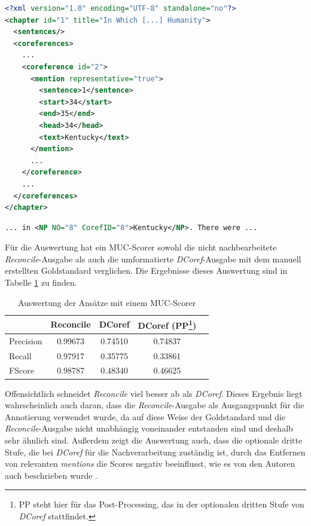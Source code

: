 \documentclass[a4paper,12pt,titlepage=true, ngerman]{scrartcl}
\begin{document}
\begin{lstlisting}[label=output:vergleich:decoref, name=vergleich_decoref.xml, language=xml, caption=Ausschnitt der \emph{DCoref}-Ausgabe für die Testdaten]
<?xml version="1.0" encoding="UTF-8" standalone="no"?>
<chapter id="1" title="In Which [...] Humanity">
  <sentences/>
  <coreferences>
    ...
    <coreference id="2">
      <mention representative="true">
        <sentence>1</sentence>
        <start>34</start>
        <end>35</end>
        <head>34</head>
        <text>Kentucky</text>
      </mention>
      ...
    </coreference>
    ...
  </coreferences>
</chapter>
\end{lstlisting}

\begin{lstlisting}[label=output:vergleich:reconcile, name=vergleich_reconcile.xml, language=xml, caption=Ausschnitt aus Listing \ref{output:vergleich:reconcile} im \emph{Reconcile}-Ausgabeformat]
... in <NP NO="8" CorefID="8">Kentucky</NP>. There were ...
\end{lstlisting}

\noindent 
Für die Auswertung hat ein MUC-Scorer sowohl die nicht nachbearbeitete \emph{Reconcile}-Ausgabe als auch 
die umformatierte \emph{DCoref}-Ausgabe mit dem manuell erstellten Goldstandard verglichen. 
Die Ergebnisse dieses Auswertung sind in Tabelle \ref{score:ergebnis} zu finden.

\begin{savenotes}
	\begin{table}[ht]
		\centering
  		\begin{tabular}{ l || c | c | c ||  r }
						& Reconcile 	& DCoref 	& DCoref (PP\footnote[1]{PP steht hier für das Post-Processing, das in der optionalen dritten Stufe von \emph{DCoref} stattfindet.}) 	& \\ \hline \hline
    			Precision 	& 0.99673 	& 0.74510	& 0.74837		& \\ \hline
    			Recall     	& 0.97917 	& 0.35775 	& 0.33861 		& \\ \hline
    			FScore    	& 0.98787  	& 0.48340 	& 0.46625 		& \\ \hline
  		\end{tabular}
  		\caption{Auswertung der Ansätze mit einem MUC-Scorer}
  		\label{score:ergebnis}
	\end{table}
\end{savenotes}

Offensichtlich schneidet \emph{Reconcile} viel besser ab als \emph{DCoref}. 
Dieses Ergebnis liegt wahrscheinlich auch daran, dass die \emph{Reconcile}-Ausgabe als 
Ausgangspunkt für die Annotierung verwendet wurde, da auf diese Weise der Goldstandard und 
die \emph{Reconcile}-Ausgabe nicht unabhängig voneinander entstanden sind und deshalb sehr ähnlich sind. 
Außerdem zeigt die Auswertung auch, dass die optionale dritte Stufe, 
die bei \emph{DCoref} für die Nachverarbeitung zuständig ist, 
durch das Entfernen von relevanten \emph{mentions} die Scores negativ beeinflusst, 
wie es von den Autoren auch beschrieben wurde \autocite[29, 32]{chris_leeetal}.
\end{document}
